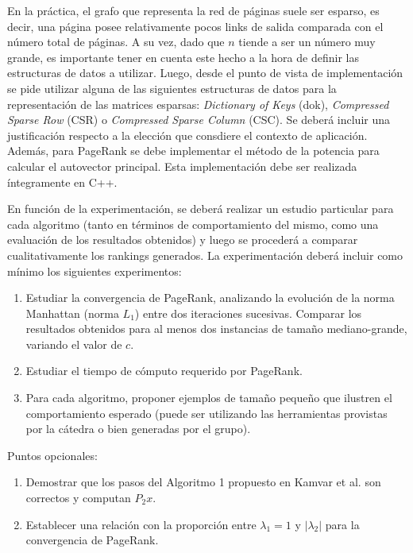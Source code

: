 En la pr\'actica, el grafo que representa la red de p\'aginas suele ser esparso, es decir, una p\'agina posee relativamente pocos links de salida comparada 
con el n\'umero total de p\'aginas. A su vez, dado que $n$ tiende a ser un n\'umero muy grande, es importante tener en cuenta este hecho a la hora de definir 
las estructuras de datos a utilizar. Luego, desde el punto de vista de implementaci\'on se pide utilizar alguna de las siguientes estructuras de datos para 
la representaci\'on de las matrices esparsas: \emph{Dictionary of Keys} (dok), \emph{Compressed Sparse Row} (CSR) o \emph{Compressed Sparse Column} (CSC). 
Se deber\'a incluir una justificaci\'on respecto a la elecci\'on que consdiere el contexto de aplicaci\'on. Adem\'as, para PageRank se debe implementar el 
m\'etodo de la potencia para calcular el autovector principal. Esta implementaci\'on debe ser realizada \'integramente en \textsc{C++}.

En funci\'on de la experimentaci\'on, se deber\'a realizar un estudio particular para cada algoritmo (tanto en t\'erminos de comportamiento
del mismo, como una evaluaci\'on de los resultados obtenidos) y luego se proceder\'a a comparar cualitativamente los rankings generados.
La experimentaci\'on deber\'a incluir como m\'inimo los siguientes experimentos:
\begin{enumerate}
\item Estudiar la convergencia de PageRank, analizando la evoluci\'on de la norma Manhattan (norma $L_1$) entre dos iteraciones sucesivas. Comparar los 
resultados obtenidos para al menos dos instancias de tama\~no mediano-grande, variando el valor de $c$. 
\item Estudiar el tiempo de c\'omputo requerido por PageRank. 
\item Para cada algoritmo, proponer ejemplos de tama\~no peque\~no que ilustren el comportamiento esperado (puede ser utilizando las herramientas provistas
por la c\'atedra o bien generadas por el grupo).
\end{enumerate}

Puntos opcionales:
\begin{enumerate}
\item Demostrar que los pasos del Algoritmo 1 propuesto en Kamvar et al. \cite{Kamvar2003} son correctos y computan $P_2 x$.
\item Establecer una relaci\'on con la proporci\'on entre $\lambda_1 = 1$ y $|\lambda_2|$ para la convergencia de PageRank.
\end{enumerate}

